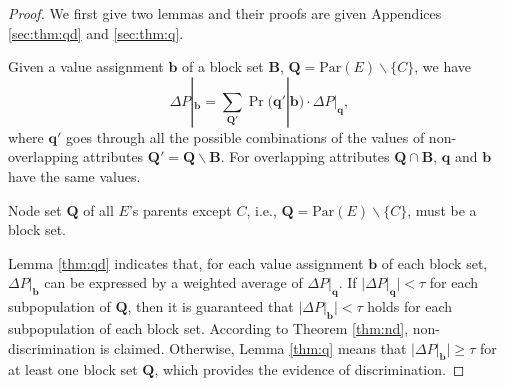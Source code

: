 \documentclass[twoside,leqno,twocolumn]{article}
\begin{document}
\begin{proof}
We first give two lemmas and their proofs are given Appendices \ref{sec:thm:qd} and \ref{sec:thm:q}.

\begin{lemma}\label{thm:qd}
Given a value assignment $\mathbf{b}$ of a block set $\mathbf{B}$, $\mathbf{Q}=\mathrm{Par}(E)\backslash \{C\}$, we have
\begin{equation*}\label{eq:qd}
\Delta P|_{\mathbf{b}}=\sum_{\mathbf{Q}'}\Pr(\mathbf{q}'|\mathbf{b})\cdot \Delta P|_{\mathbf{q}},
\end{equation*}
where $\mathbf{q}'$ goes through all the possible combinations of the values of non-overlapping attributes $\mathbf{Q}' = \mathbf{Q} \backslash \mathbf{B}$.
For overlapping attributes $\mathbf{Q} \cap \mathbf{B}$, $\mathbf{q}$ and $\mathbf{b}$ have the same values.
\end{lemma}

\begin{lemma}\label{thm:q}
Node set $\mathbf{Q}$ of all $E$'s parents except $C$, i.e., $\mathbf{Q}=\mathrm{Par}(E)\backslash \{C\}$, must be a block set.
\end{lemma}

Lemma \ref{thm:qd} indicates that, for each value assignment $\mathbf{b}$ of each block set, $\Delta P|_{\mathbf{b}}$ can be expressed by a weighted average of $\Delta P|_{\mathbf{q}}$. If $|\Delta P|_{\mathbf{q}}| < \tau$ for each subpopulation of $\mathbf{Q}$, then it is guaranteed that $|\Delta P|_{\mathbf{b}}|<\tau$ holds for each subpopulation of each block set. According to Theorem \ref{thm:nd}, non-discrimination is claimed. Otherwise, Lemma \ref{thm:q} means that $|\Delta P|_{\mathbf{b}}|\geq \tau$ for at least one block set $\mathbf{Q}$, which provides the evidence of discrimination.
\end{proof}


\end{document}
